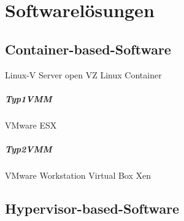 \thispagestyle{empty}

\section{Softwarelösungen}

\subsection{Container-based-Software}

Linux-V Server
open VZ
Linux Container

\subparagraph{Typ1VMM}
VMware ESX

\subparagraph{Typ2VMM}

VMware Workstation
Virtual Box
Xen


\subsection{Hypervisor-based-Software}